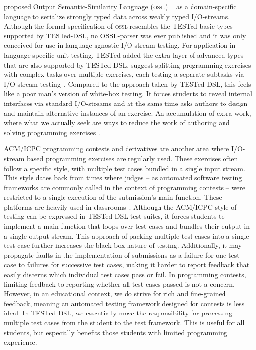 \documentclass[../main]{subfiles}
\begin{document}
 proposed Output Semantic-Similarity Language (\textsc{ossl}) ~\autocite{fonteFlexibleDynamicSystem2013} as a domain-specific language to serialize strongly typed data across weakly typed I/O-streams.
Although the formal specification of \textsc{ossl} resembles the TESTed basic types supported by TESTed-DSL, no OSSL-parser was ever published and it was only conceived for use in language-agnostic I/O-stream testing.
For application in language-specific unit testing, TESTed added the extra layer of advanced types that are also supported by TESTed-DSL\@.
 suggest splitting programming exercises with complex tasks over multiple exercises, each testing a separate subtasks via I/O-stream testing~\autocite{enstromFiveYearsKattis2011}.
Compared to the approach taken by TESTed-DSL, this feels like a poor man's version of white-box testing.
It forces students to reveal internal interfaces via standard I/O-streams and at the same time asks authors to design and maintain alternative instances of an exercise.
An accumulation of extra work, where what we actually seek are ways to reduce the work of authoring and solving programming exercises~\autocite{douceAutomaticTestbasedAssessment2005}.

ACM/ICPC programming contests and derivatives are another area where I/O-stream based programming exercises are regularly used.
These exercises often follow a specific style, with multiple test cases bundled in a single input stream.
This style dates back from times where judges -- as automated software testing frameworks are commonly called in the context of programming contests -- were restricted to a single execution of the submission's main function.
These platforms are heavily used in classrooms~\autocite{wasikSurveyOnlineJudge2018,zinovievaUseOnlineCoding2021}.
Although the ACM/ICPC style of testing can be expressed in TESTed-DSL test suites, it forces students to implement a main function that loops over test cases and bundles their output in a single output stream.
This approach of packing multiple test cases into a single test case further increases the black-box nature of testing.
Additionally, it may propagate faults in the implementation of submissions as a failure for one test case to failures for successive test cases, making it harder to report feedback that easily discerns which individual test cases pass or fail.
In programming contests, limiting feedback to reporting whether all test cases passed is not a concern.
However, in an educational context, we do strive for rich and fine-grained feedback, meaning an automated testing framework designed for contests is less ideal.
In TESTed-DSL, we essentially move the responsibility for processing multiple test cases from the student to the test framework.
This is useful for all students, but especially benefits those students with limited programming experience.
\end{document}
